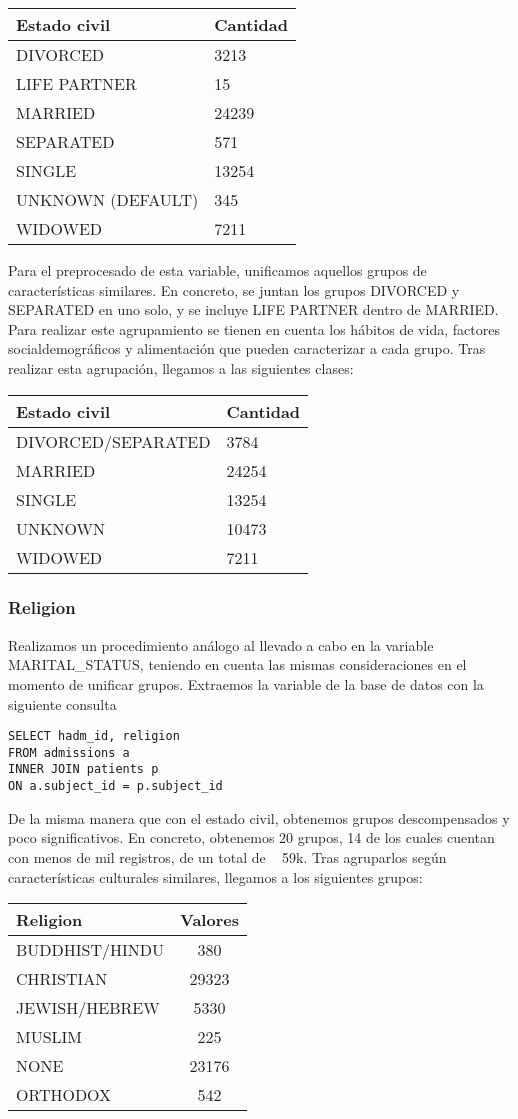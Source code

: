 \documentclass{report}
\begin{document}
\begin{longtable}[]{@{}ll@{}}
\toprule
Estado civil & Cantidad\tabularnewline
\midrule
\endhead
DIVORCED & 3213\tabularnewline
LIFE PARTNER & 15\tabularnewline
MARRIED & 24239\tabularnewline
SEPARATED & 571\tabularnewline
SINGLE & 13254\tabularnewline
UNKNOWN (DEFAULT) & 345\tabularnewline
WIDOWED & 7211\tabularnewline
\bottomrule
\end{longtable}

Para el preprocesado de esta variable, unificamos aquellos grupos de
características similares. En concreto, se juntan los grupos DIVORCED y
SEPARATED en uno solo, y se incluye LIFE PARTNER dentro de MARRIED. Para
realizar este agrupamiento se tienen en cuenta los hábitos de vida, factores socialdemográficos y
alimentación que pueden caracterizar a cada grupo. Tras realizar esta
agrupación, llegamos a las siguientes clases:
\newpage
\begin{longtable}[]{@{}ll@{}}
\toprule
Estado civil & Cantidad\tabularnewline
\midrule
\endhead
DIVORCED/SEPARATED & 3784\tabularnewline
MARRIED & 24254\tabularnewline
SINGLE & 13254\tabularnewline
UNKNOWN & 10473\tabularnewline
WIDOWED & 7211\tabularnewline
\bottomrule
\end{longtable}


\subsubsection{Religion}
Realizamos un procedimiento análogo al llevado a cabo en la variable
MARITAL\_STATUS, teniendo en cuenta las mismas consideraciones en el
momento de unificar grupos. Extraemos la variable de la base de datos
con la siguiente consulta
\begin{verbatim}
SELECT hadm_id, religion 
FROM admissions a
INNER JOIN patients p
ON a.subject_id = p.subject_id
\end{verbatim}
De la misma manera que con el estado civil, obtenemos grupos descompensados y poco significativos. En concreto, obtenemos 20 grupos, 14 de los cuales cuentan con menos de mil registros, de un total de ~ 59k. Tras agruparlos según características culturales similares, llegamos a los siguientes grupos:
\begin{longtable}[]{@{}lc@{}}
\toprule
Religion & Valores\tabularnewline
\midrule
\endhead
BUDDHIST/HINDU & 380\tabularnewline
CHRISTIAN & 29323\tabularnewline
JEWISH/HEBREW & 5330\tabularnewline
MUSLIM & 225\tabularnewline
NONE & 23176\tabularnewline
ORTHODOX & 542\tabularnewline
\bottomrule
\end{longtable}
\end{document}

